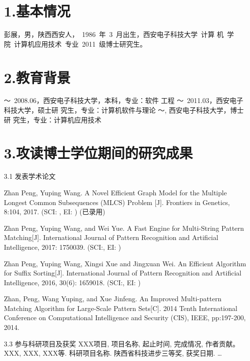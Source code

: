 
\begin{resume}

\section*{1.\hspace{0.75em}基本情况}
彭展，男，陕西西安人，~1986~年~3~月出生，西安电子科技大学~计算
机~学院~计算机应用技术~专业~2011~级博士研究生。
\section*{2.\hspace{0.75em}教育背景}
\begin{resumelist*}
  ～~2008.06，西安电子科技大学，本科，专业：软件
  工程
  ～~2011.03，西安电子科技大学，硕士研
  究生，专业：计算机软件与理论
  ～\hspace{3.5em}, 西安电子科技大学，博士研
  究生，专业：计算机应用技术
\end{resumelist*}

\section*{3.\hspace{0.75em}攻读博士学位期间的研究成果}
\begin{resumelist}{\hspace{-0.25em}3.1\hspace{0.5em} 发表学术论文}

  \resumelistitem Zhan Peng, Yuping Wang. A Novel Efficient Graph
  Model for the Multiple Longest Common Subsequences (MLCS) Problem
  [J]. Frontiers in Genetics, 8:104, 2017. (SCI: , EI: ) (已录用)

  \resumelistitem Zhan Peng, Yuping Wang, and Wei Yue. A Fast Engine
  for Multi-String Pattern Matching[J]. International Journal of Pattern
  Recognition and Artificial Intelligence, 2017: 1750039. (SCI:, EI: )

  \resumelistitem Zhan Peng, Yuping Wang, Xingsi Xue and Jingxuan
  Wei. An Efficient Algorithm for Suffix Sorting[J]. International
  Journal of Pattern Recognition and Artificial Intelligence, 2016,
  30(6): 1659018. (SCI:, EI: )

  \resumelistitem Zhan, Peng, Wang Yuping, and Xue Jinfeng. An
  Improved Multi-pattern Matching Algorithm for Large-Scale Pattern
  Sets[C]. 2014 Tenth International Conference on Computational
  Intelligence and Security (CIS), IEEE, pp:197-200, 2014.

\end{resumelist}

\begin{resumelist}{\hspace{-0.25em}3.3\hspace{0.5em} 参与科研项目及获奖}
\resumelistitem XXX项目, 项目名称, 起止时间, 完成情况, 作者贡献。
\resumelistitem XXX, XXX, XXX等. 科研项目名称. 陕西省科技进步三等奖, 获奖日期.
\resumelistitem \ldots
\end{resumelist}
\end{resume}
